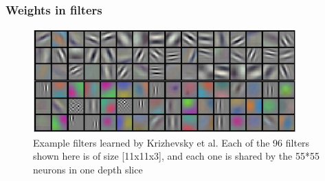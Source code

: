 \begin{frame}
        \frametitle{Weights in filters}

        \begin{figure}
                \includegraphics[width=0.9\textwidth]{Pics/weights}\\
		\small{Example filters learned by Krizhevsky et al. Each of the 96 filters shown here is of size [11x11x3], and each one is shared by the 55*55 neurons in one depth slice}
        \end{figure}

\end{frame}


